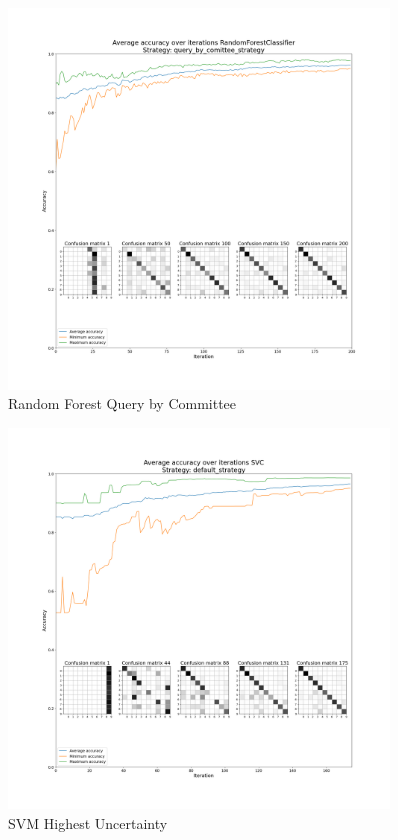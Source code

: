\begin{figure}[htbp]
\centering
\includegraphics[width=0.9\textwidth]{resources/images/active_learning_RandomForestClassifier_query_by_comittee_strategy_average.png}
\caption{Random Forest Query by Committee}
\end{figure}

\begin{figure}[htbp]
\centering
\includegraphics[width=0.9\textwidth]{resources/images/active_learning_SVC_default_strategy_average.png}
\caption{SVM Highest Uncertainty}
\end{figure}

